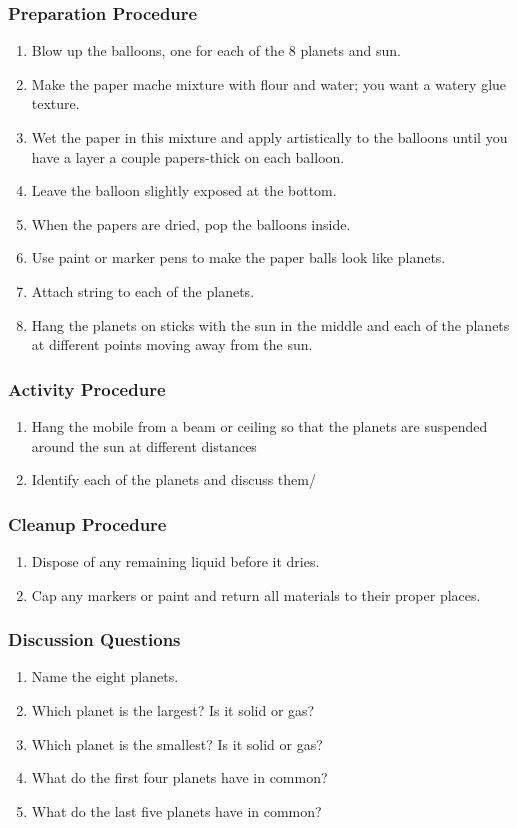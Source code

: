 \subsubsection*{Preparation Procedure}
\begin{enumerate}
\item{Blow up the balloons, one for each of the 8 planets and sun.}
\item{Make the paper mache mixture with flour and water; you want a watery glue texture.}
\item{Wet the paper in this mixture and apply artistically to the balloons until you have a layer a couple papers-thick on each balloon.}
\item{Leave the balloon slightly exposed at the bottom.}
\item{When the papers are dried, pop the balloons inside.}
\item{Use paint or marker pens to make the paper balls look like planets.}
\item{Attach string to each of the planets.}
\item{Hang the planets on sticks with the sun in the middle and each of the planets at different points moving away from the sun.}
\end{enumerate}

\subsubsection*{Activity Procedure}
\begin{enumerate}
\item{Hang the mobile from a beam or ceiling so that the planets are suspended around the sun at different distances}
\item{Identify each of the planets and discuss them/}
\end{enumerate}

\subsubsection*{Cleanup Procedure}
\begin{enumerate}
\item{Dispose of any remaining liquid before it dries.}
\item{Cap any markers or paint and return all materials to their proper places.}
\end{enumerate}

\subsubsection*{Discussion Questions}
\begin{enumerate}
\item{Name the eight planets.}
\item{Which planet is the largest?  Is it solid or gas?}
\item{Which planet is the smallest?  Is it solid or gas?}
\item{What do the first four planets have in common?}
\item{What do the last five planets have in common?}
\end{enumerate}

